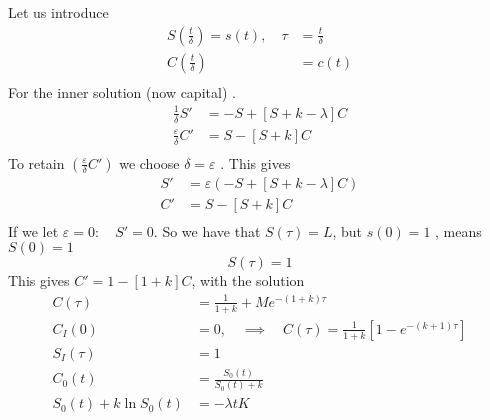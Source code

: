 \documentclass{article}
\theoremstyle{remark}
\begin{document}
\begin{enumerate}[label=(\roman*)]
Let us introduce \[
  \begin{split}
S \left( \frac{t}{\delta } \right) = s\left( t \right) , \quad  \tau   & = \frac{t}{\delta }    \\
C\left( \frac{t}{\delta } \right) &=  c\left( t \right) \\ 
  \end{split} 
\] 
For the inner solution (now capital) . \[
\begin{split}
  \frac{1}{\delta } S'  &=  -S + \left[ S + k - \lambda  \right]C \\
  \frac{\varepsilon }{\delta }  C'  &=  S - \left[ S + k \right]C \\
\end{split} 
\] 
To retain $\left( \frac{\varepsilon}{\delta } C'   \right)$ we choose $\delta = \varepsilon $ . This gives \[
\begin{split}
  S'  &=  \varepsilon  \left( -S + \left[ S + k - \lambda  \right] C \right) \\
  C'  &= S - \left[ S + k \right]C \\
\end{split} 
\] 
If we let $\varepsilon  = 0: \quad   S' = 0 $. So we have that $S\left( \tau  \right) = L$, but $s\left( 0 \right) = 1$ , means $S\left( 0 \right) =1$ \[
S\left( \tau  \right) = 1
\] 
This gives $C' = 1 - \left[ 1 + k \right] C$, with the solution \[
  \begin{split}
    C\left( \tau  \right) &=  \frac{1}{1+ k} + M e ^{- \left( 1 + k \right) \tau } \\
    C_{I}\left( 0 \right) &=  0, \quad  \implies  \quad  C\left( \tau  \right) = \frac{1}{1+ k} \left[ 1 - e ^{ -\left( k +1 \right) \tau } \right]   \\
    S_{I} \left( \tau  \right) &=  1 \\
    C_{0} \left( t \right) &=  \frac{S_{0} \left( t \right)}{ S_{0} \left( t \right) + k}  \\
    S_{0} \left( t \right) + k \ln  S_{0} \left( t \right) &=  - \lambda t  K \\
  \end{split} 
\] 
\end{enumerate}
\end{document}
